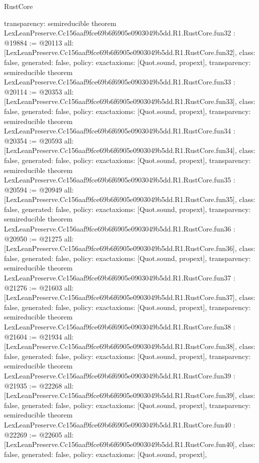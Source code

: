 \begin{lexlean}{RustCore}
\begin{coremodule}
{  transparency: semireducible
}
theorem LexLeanPreserve.Cc156aaf9fce69b6f6905e0903049b5dd.R1.RustCore.fun32 : @19884 := @20113 {
  all: [LexLeanPreserve.Cc156aaf9fce69b6f6905e0903049b5dd.R1.RustCore.fun32],
  class: false,
  generated: false,
  policy: exact{axioms: [Quot.sound, propext]},
  transparency: semireducible
}
theorem LexLeanPreserve.Cc156aaf9fce69b6f6905e0903049b5dd.R1.RustCore.fun33 : @20114 := @20353 {
  all: [LexLeanPreserve.Cc156aaf9fce69b6f6905e0903049b5dd.R1.RustCore.fun33],
  class: false,
  generated: false,
  policy: exact{axioms: [Quot.sound, propext]},
  transparency: semireducible
}
theorem LexLeanPreserve.Cc156aaf9fce69b6f6905e0903049b5dd.R1.RustCore.fun34 : @20354 := @20593 {
  all: [LexLeanPreserve.Cc156aaf9fce69b6f6905e0903049b5dd.R1.RustCore.fun34],
  class: false,
  generated: false,
  policy: exact{axioms: [Quot.sound, propext]},
  transparency: semireducible
}
theorem LexLeanPreserve.Cc156aaf9fce69b6f6905e0903049b5dd.R1.RustCore.fun35 : @20594 := @20949 {
  all: [LexLeanPreserve.Cc156aaf9fce69b6f6905e0903049b5dd.R1.RustCore.fun35],
  class: false,
  generated: false,
  policy: exact{axioms: [Quot.sound, propext]},
  transparency: semireducible
}
theorem LexLeanPreserve.Cc156aaf9fce69b6f6905e0903049b5dd.R1.RustCore.fun36 : @20950 := @21275 {
  all: [LexLeanPreserve.Cc156aaf9fce69b6f6905e0903049b5dd.R1.RustCore.fun36],
  class: false,
  generated: false,
  policy: exact{axioms: [Quot.sound, propext]},
  transparency: semireducible
}
theorem LexLeanPreserve.Cc156aaf9fce69b6f6905e0903049b5dd.R1.RustCore.fun37 : @21276 := @21603 {
  all: [LexLeanPreserve.Cc156aaf9fce69b6f6905e0903049b5dd.R1.RustCore.fun37],
  class: false,
  generated: false,
  policy: exact{axioms: [Quot.sound, propext]},
  transparency: semireducible
}
theorem LexLeanPreserve.Cc156aaf9fce69b6f6905e0903049b5dd.R1.RustCore.fun38 : @21604 := @21934 {
  all: [LexLeanPreserve.Cc156aaf9fce69b6f6905e0903049b5dd.R1.RustCore.fun38],
  class: false,
  generated: false,
  policy: exact{axioms: [Quot.sound, propext]},
  transparency: semireducible
}
theorem LexLeanPreserve.Cc156aaf9fce69b6f6905e0903049b5dd.R1.RustCore.fun39 : @21935 := @22268 {
  all: [LexLeanPreserve.Cc156aaf9fce69b6f6905e0903049b5dd.R1.RustCore.fun39],
  class: false,
  generated: false,
  policy: exact{axioms: [Quot.sound, propext]},
  transparency: semireducible
}
theorem LexLeanPreserve.Cc156aaf9fce69b6f6905e0903049b5dd.R1.RustCore.fun40 : @22269 := @22605 {
  all: [LexLeanPreserve.Cc156aaf9fce69b6f6905e0903049b5dd.R1.RustCore.fun40],
  class: false,
  generated: false,
  policy: exact{axioms: [Quot.sound, propext]},
}
\end{coremodule}
\end{lexlean}
